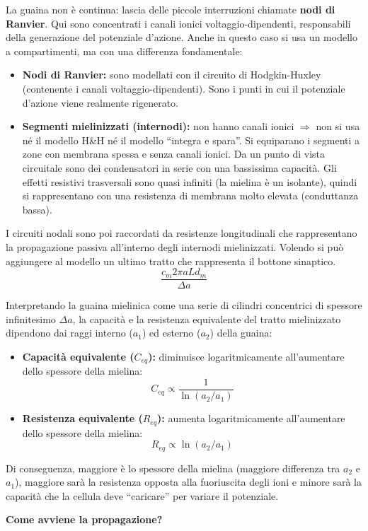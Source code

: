 La guaina non è continua: lascia delle piccole interruzioni chiamate \textbf{nodi di Ranvier}. Qui sono concentrati i canali ionici voltaggio-dipendenti, responsabili della generazione del potenziale d’azione. 
Anche in questo caso si usa un modello a compartimenti, ma con una differenza fondamentale:
\begin{itemize}
  \item \textbf{Nodi di Ranvier:} sono modellati con il circuito di Hodgkin-Huxley (contenente i canali voltaggio-dipendenti). Sono i punti in cui il potenziale d’azione viene realmente rigenerato.
  \item \textbf{Segmenti mielinizzati (internodi):} non hanno canali ionici $\Rightarrow$ non si usa né il modello H\&H né il modello “integra e spara”. Si equiparano i segmenti a zone con membrana spessa e senza canali ionici. Da un punto di vista circuitale sono dei condensatori in serie con una bassissima capacità. Gli effetti resistivi trasversali sono quasi infiniti (la mielina è un isolante), quindi si rappresentano con una resistenza di membrana molto elevata (conduttanza bassa).
\end{itemize}

I circuiti nodali sono poi raccordati da resistenze longitudinali che rappresentano la propagazione passiva all’interno degli internodi mielinizzati. Volendo si può aggiungere al modello un ultimo tratto che rappresenta il bottone sinaptico.
$$\frac{c_m 2\pi a L d_m}{\Delta a}$$

Interpretando la guaina mielinica come una serie di cilindri concentrici di spessore infinitesimo $\Delta a$, la capacità e la resistenza equivalente del tratto mielinizzato dipendono dai raggi interno ($a_1$) ed esterno ($a_2$) della guaina:
\begin{itemize}
    \item \textbf{Capacità equivalente ($C_{eq}$):} diminuisce logaritmicamente all’aumentare dello spessore della mielina:
    \[ C_{eq} \propto \frac{1}{\ln(a_2/a_1)} \]
    \item \textbf{Resistenza equivalente ($R_{eq}$):} aumenta logaritmicamente all’aumentare dello spessore della mielina:
    \[ R_{eq} \propto \ln(a_2/a_1) \]
\end{itemize}
Di conseguenza, maggiore è lo spessore della mielina (maggiore differenza tra $a_2$ e $a_1$), maggiore sarà la resistenza opposta alla fuoriuscita degli ioni e minore sarà la capacità che la cellula deve “caricare” per variare il potenziale.

\textbf{Come avviene la propagazione?}


